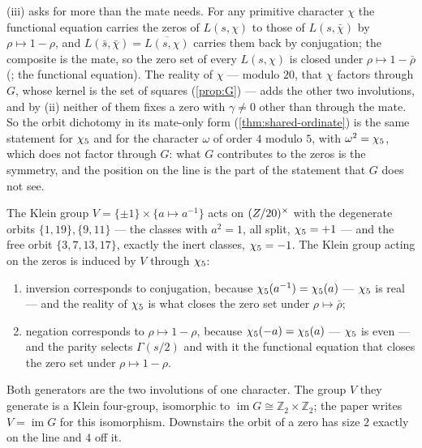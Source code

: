\begin{remark}\label{rmk:mate-without-G}
\textup{(iii)} asks for more than the mate needs.  For any primitive character
$\chi$ the functional equation carries the zeros of $L(s,\chi)$ to those of $L(s,\bar\chi)$ by
$\rho\mapsto1-\rho$, and $L(\bar s,\bar\chi)=\overline{L(s,\chi)}$ carries them back by conjugation; the
composite is the mate, so the zero set of every $L(s,\chi)$ is closed under $\rho\mapsto1-\bar\rho$
(; the functional equation).  The reality
of $\chi$ --- modulo $20$, that $\chi$ factors through $G$, whose kernel is the set of squares
(\cref{prop:G}) --- adds the other two involutions, and by \textup{(ii)} neither of them fixes a zero with
$\gamma\ne0$ other than through the mate.  So the orbit dichotomy in its mate-only form
(\cref{thm:shared-ordinate}) is the same statement for $\chi_5$ and for the character $\omega$ of order
$4$ modulo $5$, with $\omega^2=\chi_5$, which does not factor through $G$: what $G$ contributes to the
zeros is the symmetry, and the position on the line is the part of the statement that $G$ does not see.
\end{remark}

\begin{proposition}\label{prop:descent}
The Klein group $V=\{\pm1\}\times\{a\mapsto a^{-1}\}$ acts on $(Z/20)^{\times}$ with the
degenerate orbits $\{1,19\},\{9,11\}$ --- the classes with $a^2=1$, all split,
$\chi_5=+1$ --- and the free orbit $\{3,7,13,17\}$, exactly the inert classes,
$\chi_5=-1$.  The Klein group acting on the zeros is induced by $V$ through $\chi_5$:
\begin{enumerate}[label=\textup{(\roman*)}]
  \item inversion corresponds to conjugation, because $\chi_5(a^{-1})=\chi_5(a)$ ---
    $\chi_5$ is real --- and the reality of $\chi_5$ is what closes the zero set under
    $\rho\mapsto\bar\rho$;
  \item negation corresponds to $\rho\mapsto1-\rho$, because $\chi_5(-a)=\chi_5(a)$ ---
    $\chi_5$ is even --- and the parity selects $\Gamma(s/2)$ and with it the
    functional equation that closes the zero set under $\rho\mapsto1-\rho$.
\end{enumerate}
Both generators are the two involutions of one character.  The group $V$ they generate
is a Klein four-group, isomorphic to $\operatorname{im}G\cong\mathbb Z_2\times\mathbb Z_2$;
the paper writes $V=\operatorname{im}G$ for this isomorphism.  Downstairs the orbit of a zero has size $2$ exactly on the
line and $4$ off it.
%
\end{proposition}

